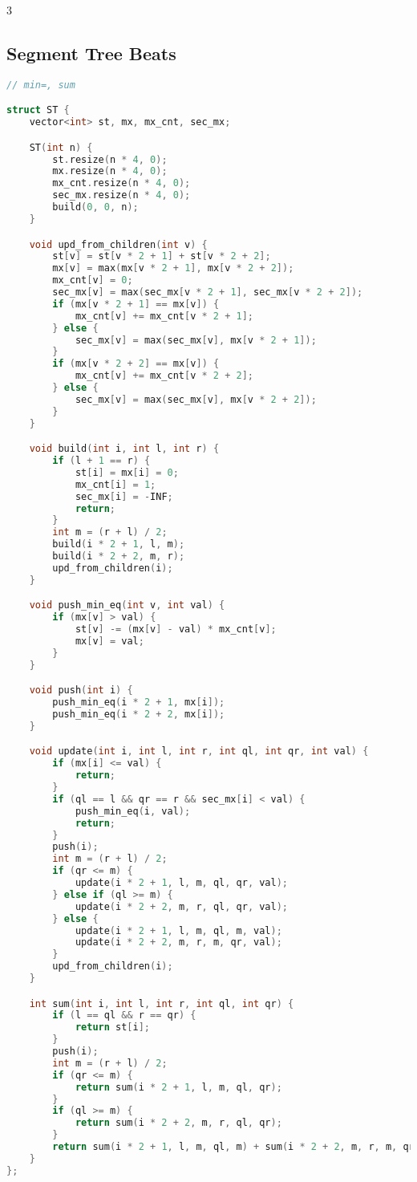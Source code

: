 \documentclass[10pt,a4paper,landscape,twosided]{extarticle}
\begin{document}
\begin{multicols*}{3}
\subsection{Segment Tree Beats}
\begin{lstlisting}[language=C++]
// min=, sum

struct ST {
    vector<int> st, mx, mx_cnt, sec_mx;

    ST(int n) {
        st.resize(n * 4, 0);
        mx.resize(n * 4, 0);
        mx_cnt.resize(n * 4, 0);
        sec_mx.resize(n * 4, 0);
        build(0, 0, n);
    }

    void upd_from_children(int v) {
        st[v] = st[v * 2 + 1] + st[v * 2 + 2];
        mx[v] = max(mx[v * 2 + 1], mx[v * 2 + 2]);
        mx_cnt[v] = 0;
        sec_mx[v] = max(sec_mx[v * 2 + 1], sec_mx[v * 2 + 2]);
        if (mx[v * 2 + 1] == mx[v]) {
            mx_cnt[v] += mx_cnt[v * 2 + 1];
        } else {
            sec_mx[v] = max(sec_mx[v], mx[v * 2 + 1]);
        }
        if (mx[v * 2 + 2] == mx[v]) {
            mx_cnt[v] += mx_cnt[v * 2 + 2];
        } else {
            sec_mx[v] = max(sec_mx[v], mx[v * 2 + 2]);
        }
    }

    void build(int i, int l, int r) {
        if (l + 1 == r) {
            st[i] = mx[i] = 0;
            mx_cnt[i] = 1;
            sec_mx[i] = -INF;
            return;
        }
        int m = (r + l) / 2;
        build(i * 2 + 1, l, m);
        build(i * 2 + 2, m, r);
        upd_from_children(i);
    }

    void push_min_eq(int v, int val) {
        if (mx[v] > val) {
            st[v] -= (mx[v] - val) * mx_cnt[v];
            mx[v] = val;
        }
    }

    void push(int i) {
        push_min_eq(i * 2 + 1, mx[i]);
        push_min_eq(i * 2 + 2, mx[i]);
    }

    void update(int i, int l, int r, int ql, int qr, int val) {
        if (mx[i] <= val) {
            return;
        }
        if (ql == l && qr == r && sec_mx[i] < val) {
            push_min_eq(i, val);
            return;
        }
        push(i);
        int m = (r + l) / 2;
        if (qr <= m) {
            update(i * 2 + 1, l, m, ql, qr, val);
        } else if (ql >= m) {
            update(i * 2 + 2, m, r, ql, qr, val);
        } else {
            update(i * 2 + 1, l, m, ql, m, val);
            update(i * 2 + 2, m, r, m, qr, val);
        }
        upd_from_children(i);
    }

    int sum(int i, int l, int r, int ql, int qr) {
        if (l == ql && r == qr) {
            return st[i];
        }
        push(i);
        int m = (r + l) / 2;
        if (qr <= m) {
            return sum(i * 2 + 1, l, m, ql, qr);
        }
        if (ql >= m) {
            return sum(i * 2 + 2, m, r, ql, qr);
        }
        return sum(i * 2 + 1, l, m, ql, m) + sum(i * 2 + 2, m, r, m, qr);
    }
};
\end{lstlisting}


\end{multicols*}
\end{document}
